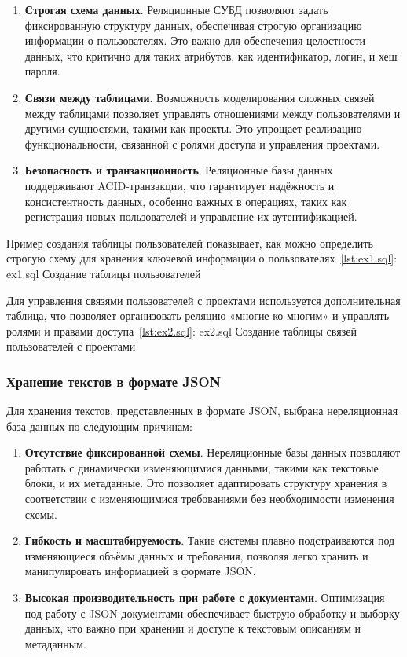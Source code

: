 \begin{enumerate}[wide=12.6mm, leftmargin=12.6mm]
    \item \textbf{Строгая схема данных}. Реляционные СУБД позволяют задать фиксированную структуру данных, обеспечивая строгую организацию информации о пользователях. Это важно для обеспечения целостности данных, что критично для таких атрибутов, как идентификатор, логин, и хеш пароля.
    \item \textbf{Связи между таблицами}. Возможность моделирования сложных связей между таблицами позволяет управлять отношениями между пользователями и другими сущностями, такими как проекты. Это упрощает реализацию функциональности, связанной с ролями доступа и управления проектами.
    \item \textbf{Безопасность и транзакционность}. Реляционные базы данных поддерживают ACID-транзакции, что гарантирует надёжность и консистентность данных, особенно важных в операциях, таких как регистрация новых пользователей и управление их аутентификацией.
\end{enumerate}

Пример создания таблицы пользователей показывает, как можно определить строгую схему для хранения ключевой информации о пользователях~\ref{lst:ex1.sql}:
	{ex1.sql}
	{Создание таблицы пользователей}

Для управления связями пользователей с проектами используется дополнительная таблица, что позволяет организовать реляцию «многие ко многим» и управлять ролями и правами доступа~\ref{lst:ex2.sql}:
	{ex2.sql}
	{Создание таблицы связей пользователей с проектами}

\clearpage

\subsubsection{Хранение текстов в формате JSON}

Для хранения текстов, представленных в формате JSON, выбрана нереляционная база данных по следующим причинам:

\begin{enumerate}[leftmargin=1.6\parindent]
    \item \textbf{Отсутствие фиксированной схемы}. Нереляционные базы данных позволяют работать с динамически изменяющимися данными, такими как текстовые блоки, и их метаданные. Это позволяет адаптировать структуру хранения в соответствии с изменяющимися требованиями без необходимости изменения схемы.
    \item \textbf{Гибкость и масштабируемость}. Такие системы плавно подстраиваются под изменяющиеся объёмы данных и требования, позволяя легко хранить и манипулировать информацией в формате JSON.
    \item \textbf{Высокая производительность при работе с документами}. Оптимизация под работу с JSON-документами обеспечивает быструю обработку и выборку данных, что важно при хранении и доступе к текстовым описаниям и метаданным.
\end{enumerate}


